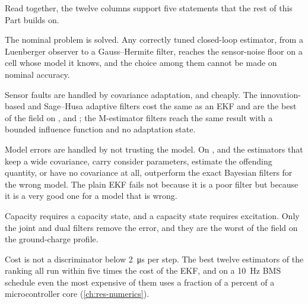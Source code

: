 Read together, the twelve columns support five statements that the rest of this Part builds
on.

The nominal problem is solved. Any correctly tuned closed-loop estimator, from a Luenberger
observer to a Gauss--Hermite filter, reaches the sensor-noise floor on a cell whose model it
knows, and the choice among them cannot be made on nominal accuracy.

Sensor faults are handled by covariance adaptation, and cheaply. The innovation-based and
Sage--Husa adaptive filters cost the same as an EKF and are the best of the field on
,  and ; the M-estimator filters reach
the same result with a bounded influence function and no adaptation state.

Model errors are handled by not trusting the model. On ,
 and  the estimators that keep a wide covariance, carry
consider parameters, estimate the offending quantity, or have no covariance at all,
outperform the exact Bayesian filters for the wrong model. The plain EKF fails
 not because it is a poor filter but because it is a very good one for a model
that is wrong.

Capacity requires a capacity state, and a capacity state requires excitation. Only the joint
and dual filters remove the  error, and they are the worst of the field on the
ground-charge profile.

Cost is not a discriminator below \SI{2}{\micro\second} per step. The best twelve estimators
of the ranking all run within five times the cost of the EKF, and on a \SI{10}{\hertz} BMS
schedule even the most expensive of them uses a fraction of a percent of a
microcontroller core (\cref{ch:res-numerics}).
